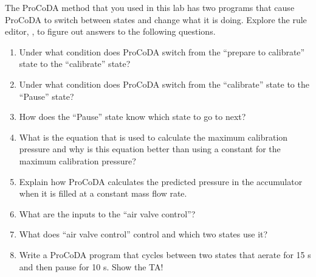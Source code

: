 \documentclass[letterpaper,10pt,english]{sphinxmanual}
\begin{document}
The ProCoDA method that you used in this lab has two programs that cause ProCoDA to switch between states and change what it is doing. Explore the rule editor, , to figure out answers to the following questions.
\begin{enumerate}
\item {} 
Under what condition does ProCoDA switch from the “prepare to calibrate” state to the “calibrate” state?

\item {} 
Under what condition does ProCoDA switch from the “calibrate” state to the “Pause” state?

\item {} 
How does the “Pause” state know which state to go to next?

\item {} 
What is the equation that is used to calculate the maximum calibration pressure and why is this equation better than using a constant for the maximum calibration pressure?

\item {} 
Explain how ProCoDA calculates the predicted pressure in the accumulator when it is filled at a constant mass flow rate.

\item {} 
What are the inputs to the “air valve control”?

\item {} 
What does “air valve control” control and which two states use it?

\item {} 
Write a ProCoDA program that cycles between two states that aerate for 15 s and then pause for 10 s. Show the TA!

\end{enumerate}
\end{document}
